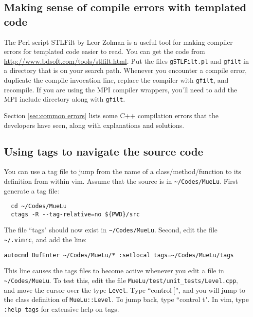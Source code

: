 \subsection{Making sense of compile errors with templated code}
The Perl script STLFilt by Leor Zolman is a useful tool for making compiler errors for templated code easier to read.  You
can get the code from \url{http://www.bdsoft.com/tools/stlfilt.html}.
Put the files \verb!gSTLFilt.pl! and \verb!gfilt! in a directory that is on your search path.
Whenever you encounter a compile error, duplicate the compile invocation line, replace the compiler with \verb!gfilt!, and recompile.
If you are using the MPI compiler wrappers, you'll need to add the MPI include directory along with
\verb!gfilt!.

Section \ref{sec:common errors} lists some C++ compilation errors that the \muelu developers have seen, along
with explanations and solutions.

\subsection{Using tags to navigate the \muelu source code}
You can use a tag file to jump from the name of a class/method/function
to its definition from within vim.   Assume that the \muelu source is in \verb!~/Codes/MueLu!.  First generate a tag file:
\begin{verbatim}
  cd ~/Codes/MueLu
  ctags -R --tag-relative=no ${PWD}/src
\end{verbatim}
The file ``tags" should now exist in \verb!~/Codes/MueLu!.  Second, edit the file \verb!~/.vimrc!, and add the
line:
\begin{verbatim}
autocmd BufEnter ~/Codes/MueLu/* :setlocal tags=~/Codes/MueLu/tags
\end{verbatim}
This line causes the tags files to become active whenever you edit a file in \verb!~/Codes/MueLu!.  To test this, edit
the file \verb!MueLu/test/unit_tests/Level.cpp!, and move the cursor over the type \verb!Level!.  Type ``control ]",
and you will jump to the class definition of \verb!MueLu::Level!.  To jump back, type ``control t".
In vim, type \verb!:help tags! for extensive help on tags.
